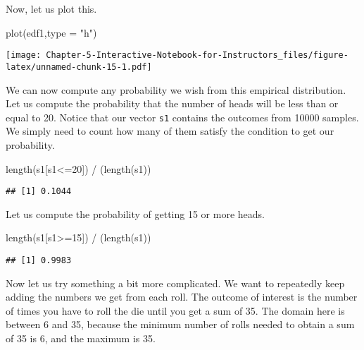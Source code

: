 \documentclass[
]{article}
\newenvironment{Shaded}{\begin{snugshade}}{\end{snugshade}}
\newcommand{\AttributeTok}[1]{\textcolor[rgb]{0.77,0.63,0.00}{#1}}
\newcommand{\DecValTok}[1]{\textcolor[rgb]{0.00,0.00,0.81}{#1}}
\newcommand{\FunctionTok}[1]{\textcolor[rgb]{0.00,0.00,0.00}{#1}}
\newcommand{\NormalTok}[1]{#1}
\newcommand{\SpecialCharTok}[1]{\textcolor[rgb]{0.00,0.00,0.00}{#1}}
\newcommand{\StringTok}[1]{\textcolor[rgb]{0.31,0.60,0.02}{#1}}
\begin{document}
Now, let us plot this.

\begin{Shaded}
\begin{Highlighting}[]
\FunctionTok{plot}\NormalTok{(edf1,}\AttributeTok{type =} \StringTok{"h"}\NormalTok{)}
\end{Highlighting}
\end{Shaded}

\texttt{[image: Chapter-5-Interactive-Notebook-for-Instructors\_files/figure-latex/unnamed-chunk-15-1.pdf]}

We can now compute any probability we wish from this empirical
distribution. Let us compute the probability that the number of heads
will be less than or equal to 20. Notice that our vector \texttt{s1}
contains the outcomes from 10000 samples. We simply need to count how
many of them satisfy the condition to get our probability.

\begin{Shaded}
\begin{Highlighting}[]
\FunctionTok{length}\NormalTok{(s1[s1}\SpecialCharTok{\textless{}=}\DecValTok{20}\NormalTok{]) }\SpecialCharTok{/}\NormalTok{ (}\FunctionTok{length}\NormalTok{(s1))}
\end{Highlighting}
\end{Shaded}

\begin{verbatim}
## [1] 0.1044
\end{verbatim}

Let us compute the probability of getting 15 or more heads.

\begin{Shaded}
\begin{Highlighting}[]
\FunctionTok{length}\NormalTok{(s1[s1}\SpecialCharTok{\textgreater{}=}\DecValTok{15}\NormalTok{]) }\SpecialCharTok{/}\NormalTok{ (}\FunctionTok{length}\NormalTok{(s1))}
\end{Highlighting}
\end{Shaded}

\begin{verbatim}
## [1] 0.9983
\end{verbatim}

Now let us try something a bit more complicated. We want to repeatedly
keep adding the numbers we get from each roll. The outcome of interest
is the number of times you have to roll the die until you get a sum of
35. The domain here is between 6 and 35, because the minimum number of
rolls needed to obtain a sum of 35 is 6, and the maximum is 35.
\end{document}
